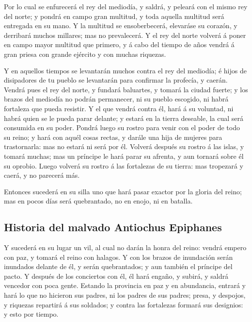  Por lo cual se enfurecerá el rey del mediodía, y saldrá, y
peleará con el mismo rey del norte; y pondrá en campo gran multitud, y
toda aquella multitud será entregada en su mano.  Y la
multitud se ensoberbecerá, elevaráse su corazón, y derribará muchos
millares; mas no prevalecerá.  Y el rey del norte volverá á
poner en campo mayor multitud que primero, y á cabo del tiempo de años
vendrá á gran priesa con grande ejército y con muchas riquezas.

 Y en aquellos tiempos se levantarán muchos contra el rey
del mediodía; é hijos de disipadores de tu pueblo se levantarán para
confirmar la profecía, y caerán.  Vendrá pues el rey del
norte, y fundará baluartes, y tomará la ciudad fuerte; y los brazos del
mediodía no podrán permanecer, ni su pueblo escogido, ni habrá fortaleza
que pueda resistir.  Y el que vendrá contra él, hará á su
voluntad, ni habrá quien se le pueda parar delante; y estará en la
tierra deseable, la cual será consumida en su poder. 
Pondrá luego su rostro para venir con el poder de todo su reino; y hará
con aquél cosas rectas, y darále una hija de mujeres para trastornarla:
mas no estará ni será por él.  Volverá después su rostro á
las islas, y tomará muchas; mas un príncipe le hará parar su afrenta, y
aun tornará sobre él su oprobio.  Luego volverá su rostro á
las fortalezas de su tierra: mas tropezará y caerá, y no parecerá más.

 Entonces sucederá en su silla uno que hará pasar exactor
por la gloria del reino; mas en pocos días será quebrantado, no en
enojo, ni en batalla.

\hypertarget{historia-del-malvado-antiochus-epiphanes}{%
\subsection{Historia del malvado Antiochus
Epiphanes}\label{historia-del-malvado-antiochus-epiphanes}}

 Y sucederá en su lugar un vil, al cual no darán la honra
del reino: vendrá empero con paz, y tomará el reino con halagos.
 Y con los brazos de inundación serán inundados delante de
él, y serán quebrantados; y aun también el príncipe del pacto.
 Y después de los conciertos con él, él hará engaño, y
subirá, y saldrá vencedor con poca gente.  Estando la
provincia en paz y en abundancia, entrará y hará lo que no hicieron sus
padres, ni los padres de sus padres; presa, y despojos, y riquezas
repartirá á sus soldados; y contra las fortalezas formará sus designios:
y esto por tiempo.

